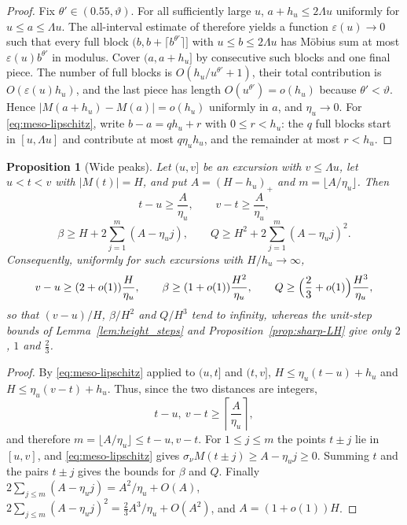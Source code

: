 \documentclass[11pt]{amsart}
\numberwithin{equation}{section}
\theoremstyle{plain}
\newtheorem{proposition}[theorem]{Proposition}
\theoremstyle{definition}
\theoremstyle{remark}
\begin{document}
\begin{proof}
Fix $\theta'\in(0.55,\vartheta)$.  For all sufficiently large $u$,
$a+h_u\le2\Lambda u$ uniformly for $u\le a\le\Lambda u$.  The
all-interval estimate of \cite{MatomakiTeravainen2023} therefore yields a
function $\varepsilon(u)\to0$ such that every full block
$(b,b+\lceil b^{\theta'}\rceil]$ with $u\le b\le2\Lambda u$ has
Möbius sum at most $\varepsilon(u)b^{\theta'}$ in modulus.  Cover
$(a,a+h_u]$ by consecutive such blocks and one final piece.  The number of
full blocks is $O(h_u/u^{\theta'}+1)$, their total contribution is
$O(\varepsilon(u)h_u)$, and the last piece has length
$O(u^{\theta'})=o(h_u)$ because $\theta'<\vartheta$.  Hence
$|M(a+h_u)-M(a)|=o(h_u)$ uniformly in $a$, and $\eta_u\to0$. For
\eqref{eq:meso-lipschitz}, write $b-a=qh_u+r$ with $0\le r<h_u$: the $q$
full blocks start in $[u,\Lambda u]$ and contribute at most $q\eta_uh_u$,
and the remainder at most $r<h_u$.
\end{proof}

\begin{proposition}[Wide peaks]
\label{prop:wide-peaks}
Let $(u,v]$ be an excursion with $v\le\Lambda u$, let $u<t<v$ with
$|M(t)|=H$, and put $A=(H-h_u)_+$ and $m=\lfloor A/\eta_u\rfloor$. Then
\[
t-u\ge\frac A{\eta_u},\qquad v-t\ge\frac A{\eta_u},
\]
\[
\beta\ge H+2\sum_{j=1}^m(A-\eta_uj),\qquad
Q\ge H^2+2\sum_{j=1}^m(A-\eta_uj)^2 .
\]
Consequently, uniformly for such excursions with $H/h_u\to\infty$,
\[
v-u\ge(2+o(1))\frac H{\eta_u},\qquad
\beta\ge(1+o(1))\frac{H^2}{\eta_u},\qquad
Q\ge\Bigl(\frac23+o(1)\Bigr)\frac{H^3}{\eta_u},
\]
so that $(v-u)/H$, $\beta/H^2$ and $Q/H^3$ tend to infinity, whereas the
unit-step bounds of Lemma~\ref{lem:height_steps} and
Proposition~\ref{prop:sharp-LH} give only $2$, $1$ and $\frac23$.
\end{proposition}

\begin{proof}
By \eqref{eq:meso-lipschitz} applied to $(u,t]$ and $(t,v]$,
$H\le\eta_u(t-u)+h_u$ and $H\le\eta_u(v-t)+h_u$.  Thus, since the two
distances are integers,
\[
 t-u,\ v-t\ge\left\lceil\frac{A}{\eta_u}\right\rceil,
\]
and therefore $m=\lfloor A/\eta_u\rfloor\le t-u,v-t$.  For
$1\le j\le m$ the points $t\pm j$ lie in $[u,v]$, and \eqref{eq:meso-lipschitz} gives
$\sigma_\nu M(t\pm j)\ge A-\eta_uj\ge0$. Summing $t$ and the pairs $t\pm j$
gives the bounds for $\beta$ and $Q$. Finally
$2\sum_{j\le m}(A-\eta_uj)=A^2/\eta_u+O(A)$,
$2\sum_{j\le m}(A-\eta_uj)^2=\frac23A^3/\eta_u+O(A^2)$, and $A=(1+o(1))H$.
\end{proof}
\end{document}
